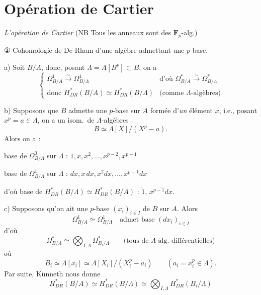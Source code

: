 \documentclass[11pt,a4paper]{article}
\begin{document}
\section{Opération de Cartier}

\emph{L'opération de Cartier} (NB Tous les anneaux sont des $\mathbf{F}_{p}$-alg.)

① Cohomologie de De Rham d'une algèbre admettant une $p$-base.

a) Soit $B/A$, donc, posant $\Lambda = A[B^{p}] \subset B$, on a
\[
\begin{cases} \Omega^{1}_{B/A} \xrightarrow{\sim} \Omega^{1}_{B/\Lambda} & \text{d'où } \Omega^{*}_{B/A} \xrightarrow{\sim} \Omega^{*}_{B/\Lambda} \\ \text{donc } H^{*}_{DR}(B/A) \simeq H^{*}_{DR}(B/\Lambda) & \text{(comme $\Lambda$-algèbres)} \end{cases}
\]

b) Supposons que $B$ admette une $p$-base sur $A$ formée d'\emph{un} élément $x$, i.e., \struck{\ill{} \ill{}} posant $x^{p} = a \in \Lambda$, on a un isom.\ de $\Lambda$-algèbres
\[
B \simeq \Lambda[X]/(X^{p} - a) .
\]
Alors on a :

base de $\Omega^{0}_{B/\Lambda}$ sur $\Lambda$ : $1, x, x^{2}, \ldots, x^{p-2}, x^{p-1}$

base de $\Omega^{1}_{B/\Lambda}$ sur $\Lambda$ : $dx, x\,dx, x^{2}dx, \ldots, x^{p-1}dx$

d'où base de $H^{*}_{DR}(B/\Lambda) \simeq H^{*}_{DR}(B/A)$ : $\dot{1}$, $\overline{x^{p-1}dx}$.


c) Supposons qu'on ait une $p$-base $(x_{i})_{i \in I}$ de $B$ sur $A$. Alors \struck{\ill{}}
\[
\Omega^{1}_{B/A} \simeq \Omega^{1}_{B/\Lambda} \quad \text{admet base } (dx_{i})_{i \in I}
\]
d'où
\[
\Omega^{*}_{B/\Lambda} \simeq \bigotimes_{I,\Lambda} \Omega^{*}_{B_{i}/\Lambda} \qquad \text{(tous de $\Lambda$-alg.\ différentielles)}
\]
où
\[
B_{i} \simeq \Lambda[x_{i}] \simeq \Lambda[X_{i}]/(X_{i}^{p} - a_{i}) \qquad (a_{i} = x_{i}^{p} \in \Lambda) .
\]
Par suite, Künneth nous donne
\[
H^{*}_{DR}(B/A) \simeq H^{*}_{DR}(B/\Lambda) \simeq \bigotimes_{I,\Lambda} H^{*}_{DR}(B_{i}/\Lambda)
\]
\end{document}
